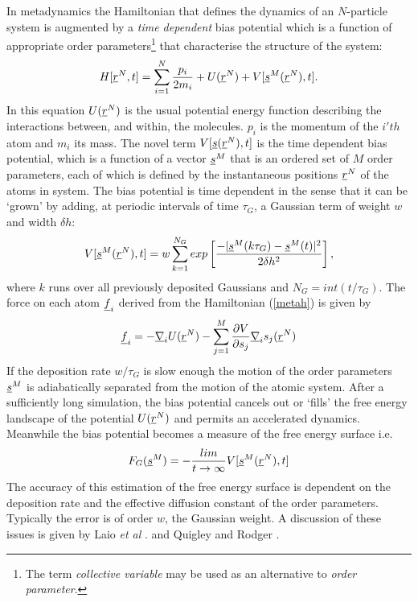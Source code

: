In metadynamics the Hamiltonian that defines the dynamics of an $N$-particle
system is augmented by a {\em time dependent} bias potential which is a function
of appropriate order parameters\footnote{The term {\em collective variable}
  may be used as an alternative to {\em order parameter}. } that characterise
the structure of the system:
\begin{equation}
H[\mbox{$\underline{r}$}^{N},t]=\sum_{i=1}^{N}\frac{p_{i}}{2m_{i}} + U(\mbox{$\underline{r}$}^{N})+ 
V[\mbox{$\underline{s}$}^{M}(\mbox{$\underline{r}$}^{N}),t].\label{metah}
\end{equation}
In this equation $U(\mbox{$\underline{r}$}^{N})$ is the usual potential energy function
describing the interactions between, and within, the molecules. $p_{i}$ is the
momentum of the $i'th$ atom and $m_{i}$ its mass. The novel term
$V[\mbox{$\underline{s}$}(\mbox{$\underline{r}$}^{N}),t]$ is the time dependent bias potential, which is a
function of a vector $\mbox{$\underline{s}$}^{M}$ that is an ordered set of $M$ order
parameters, each of which is defined by the instantaneous positions
$\mbox{$\underline{r}$}^{N}$ of the atoms in system. The bias potential is time dependent in
the sense that it can be `grown' by adding, at periodic intervals of time
$\tau_{G}$, a Gaussian term of weight $w$ and width $\delta h$:
\begin{equation}
V[\mbox{$\underline{s}$}^{M}(\mbox{$\underline{r}$}^{N}),t]=w\sum_{k=1}^{N_{G}}
exp \left [\frac{-|\mbox{$\underline{s}$}^{M}(k\tau_{G})-\mbox{$\underline{s}$}^{M}(t)|^{2}}
{2\delta h^{2}} \right ], \label{depgauss}
\end{equation}
where $k$ runs over all previously deposited Gaussians and
$N_{G}=int(t/\tau_{G})$. 
The force on each atom $\mbox{$\underline{f}$}_{i}$ derived from the Hamiltonian
(\ref{metah}) is given by
\begin{equation}
\mbox{$\underline{f}$}_{i}=-\mbox{$\underline{\nabla}$}_{i} U(\mbox{$\underline{r}$}^{N}) - \sum_{j=1}^{M}
\frac{\partial V}{\partial s_{j}}\mbox{$\underline{\nabla}$}_{i} s_{j}(\mbox{$\underline{r}$}^{N})
\end{equation}
If the deposition rate $w/\tau_{G}$ is slow enough the motion of the order
parameters $\mbox{$\underline{s}$}^{M}$ is adiabatically separated from the motion of the
atomic system. After a sufficiently long simulation, the bias potential
cancels out or `fills' the free energy landscape of the potential
$U(\mbox{$\underline{r}$}^{N})$ and permits an accelerated dynamics. Meanwhile the bias
potential becomes a measure of the free energy surface i.e.
\begin{equation}
F_{G}(\mbox{$\underline{s}$}^{M})=-\frac{lim}{t \rightarrow \infty}
V[\mbox{$\underline{s}$}^{M}(\mbox{$\underline{r}$}^{N}),t] \label{metafree}
\end{equation}
The accuracy of this estimation of the free energy surface is dependent on the
deposition rate and the effective diffusion constant of the order
parameters. Typically the error is of order $w$, the Gaussian weight.
A discussion of these issues is given by Laio {\em et al} \cite{laio-05a}.
and Quigley and Rodger \cite{quigley-09a}.

